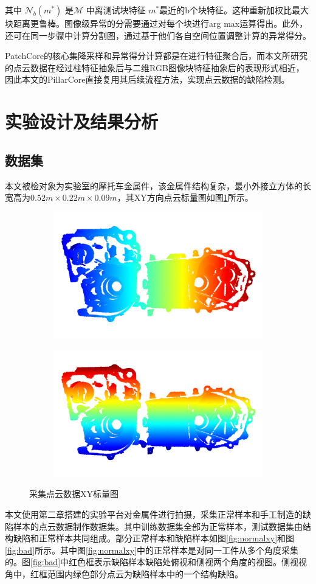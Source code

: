 其中 $\mathcal{N}_{b}\left(m^{*}\right)$ 是$\mathcal{M}$ 中离测试块特征 $m^{*}$最近的b个块特征。这种重新加权比最大块距离更鲁棒。图像级异常的分需要通过对每个块进行arg max运算得出。此外，还可在同一步骤中计算分割图，通过基于他们各自空间位置调整计算的异常得分。

PatchCore的核心集降采样和异常得分计算都是在进行特征聚合后，而本文所研究的点云数据在经过柱特征抽象后与二维RGB图像块特征抽象后的表现形式相近，因此本文的PillarCore直接复用其后续流程方法，实现点云数据的缺陷检测。

\section{实验设计及结果分析}
\subsection{数据集}
本文被检对象为实验室的摩托车金属件，该金属件结构复杂，最小外接立方体的长宽高为$0.52m\times 0.22m \times 0.09m$，其XY方向点云标量图如图\ref{fig:pcdxy}所示。
\begin{figure}[htbp]
    \centering
    \begin{subfigure}
        \centering
        \includegraphics[width=.4\linewidth]{figures/3/normal-x.png}  
      \end{subfigure}
      \begin{subfigure}
        \centering
        \includegraphics[width=.4\linewidth]{figures/3/normal-y.png} 
      \end{subfigure}
    \caption{采集点云数据XY标量图}
    \label{fig:pcdxy}
  \end{figure}

本文使用第二章搭建的实验平台对金属件进行拍摄，采集正常样本和手工制造的缺陷样本的点云数据制作数据集。其中训练数据集全部为正常样本，测试数据集由结构缺陷和正常样本共同组成。部分正常样本和缺陷样本如图\ref{fig:normalxy}和图\ref{fig:bad}所示。其中图\ref{fig:normalxy}中的正常样本是对同一工件从多个角度采集的。图\ref{fig:bad}中红色框表示缺陷样本缺陷处俯视和侧视两个角度的视图。侧视视角中，红框范围内绿色部分点云为缺陷样本中的一个结构缺陷。

